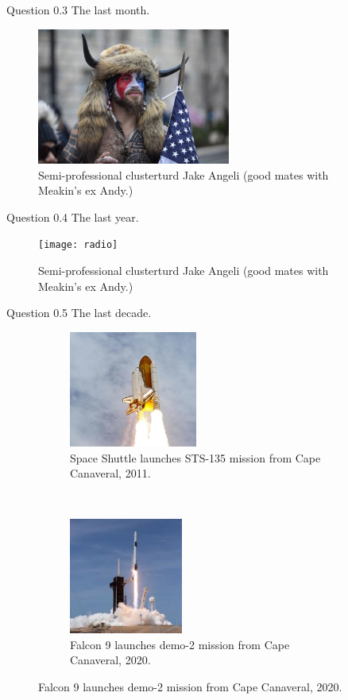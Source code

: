 \documentclass{beamer}
\begin{document}
\begin{frame}{Question 0.3}
The last month.
\begin{figure}[htbp]
\centering
\includegraphics[width=2.5in]{ja.jpg}
\caption{Semi-professional clusterturd Jake Angeli (good mates with Meakin's ex Andy.)}
\end{figure}
\end{frame}

\begin{frame}{Question 0.4}
The last year.
\begin{figure}[htbp]
\centering
\texttt{[image: radio]}
\caption{Semi-professional clusterturd Jake Angeli (good mates with Meakin's ex Andy.)}
\end{figure}
\end{frame}



\begin{frame}{Question 0.5}
The last decade.
\begin{figure}[t!]
\centering
\begin{subfigure}[t]{0.45\textwidth}

    \centering
    \includegraphics[height=1.5in]{ssatlantis.jpg}
    \caption{Space Shuttle launches STS-135 mission from Cape Canaveral, 2011.}
    
\end{subfigure}
~ 
\begin{subfigure}[t]{0.45\textwidth}
    \centering
    \includegraphics[height=1.5in]{falcon9.png}
    \caption{Falcon 9 launches demo-2 mission from Cape Canaveral, 2020.}
    
\end{subfigure}
\end{figure}
\end{frame}
\end{document}
